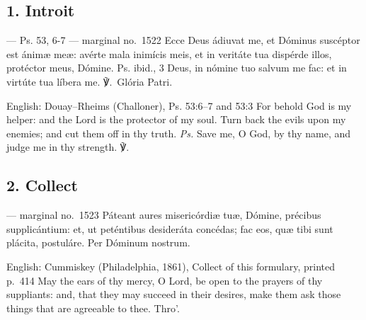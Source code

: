 \elementguard
\subsection*{1. Introit }

\begin{appointedlatin}{ --- Ps. 53, 6-7 --- marginal no.\ 1522}
Ecce Deus ádiuvat me, et Dóminus suscéptor est ánimæ meæ: avérte mala inimícis
meis, et in veritáte tua dispérde illos, protéctor meus, Dómine. \textnormal{Ps.
ibid., 3} Deus, in nómine tuo salvum me fac: et in virtúte tua líbera me.
℣.~Glória Patri.
\end{appointedlatin}

\begin{namedtranslation}{English: Douay--Rheims (Challoner), Ps. 53:6--7 and 53:3}
For behold God is my helper: and the Lord is the protector of my soul. Turn
back the evils upon my enemies; and cut them off in thy truth. \textit{Ps.}
Save me, O God, by thy name, and judge me in thy strength. ℣.~
\end{namedtranslation}


\elementguard
\subsection*{2. Collect }

\begin{appointedlatin}{ --- marginal no.\ 1523}
Páteant aures misericórdiæ tuæ, Dómine, précibus supplicántium: et, ut
peténtibus desideráta concédas; fac eos, quæ tibi sunt plácita, postuláre. Per
Dóminum nostrum.
\end{appointedlatin}

\begin{namedtranslation}{English: Cummiskey (Philadelphia, 1861), Collect of this formulary, printed p.~414}
May the ears of thy mercy, O Lord, be open to the prayers of thy suppliants:
and, that they may succeed in their desires, make them ask those things that
are agreeable to thee. Thro'.
\end{namedtranslation}

